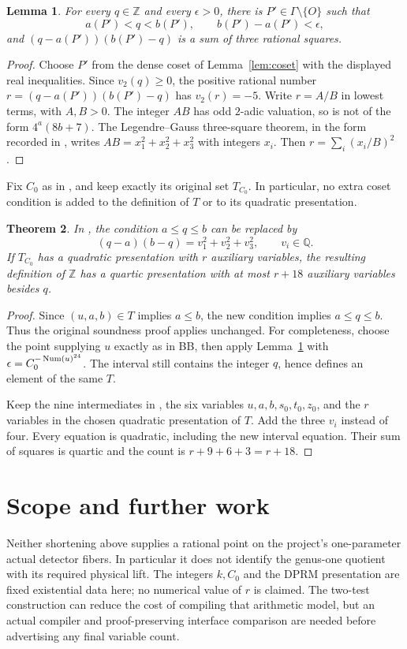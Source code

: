 \documentclass[11pt,a4paper]{article}
\newtheorem{theorem}{Theorem}[section]
\newtheorem{lemma}[theorem]{Lemma}
\newcommand{\Q}{\mathbb Q}\newcommand{\Z}{\mathbb Z}
\begin{document}
\begin{lemma}\label{lem:three}
For every $q\in\Z$ and every $\epsilon>0$, there is
$P'\in\Gamma\setminus\{O\}$ such that
\[
 a(P')<q<b(P'),\qquad b(P')-a(P')<\epsilon,
\]
and $(q-a(P'))(b(P')-q)$ is a sum of three rational squares.
\end{lemma}
\begin{proof}
Choose $P'$ from the dense coset of Lemma~\ref{lem:coset} with
the displayed real inequalities. Since $v_2(q)\ge0$, the positive
rational number $r=(q-a(P'))(b(P')-q)$ has $v_2(r)=-5$.
Write $r=A/B$ in lowest terms, with $A,B>0$. The integer $AB$ has
odd $2$-adic valuation, so is not of the form $4^a(8b+7)$.
The Legendre--Gauss three-square theorem, in the form recorded in
\cite{Squares}, writes $AB=x_1^2+x_2^2+x_3^2$ with integers $x_i$.
Then $r=\sum_i(x_i/B)^2$.
\end{proof}

Fix $C_0$ as in \cite[Theorem A]{BB}, and keep exactly its original
set $T_{C_0}$. In particular, no extra coset condition is added to
the definition of $T$ or to its quadratic presentation.

\begin{theorem}\label{thm:wrapper}
In \cite[Theorem A]{BB}, the condition $a\le q\le b$ can be
replaced by
\[
 (q-a)(b-q)=v_1^2+v_2^2+v_3^2,\qquad v_i\in\Q.
\]
If $T_{C_0}$ has a quadratic presentation with $r$ auxiliary
variables, the resulting definition of $\Z$ has a quartic
presentation with at most $r+18$ auxiliary variables besides $q$.
\end{theorem}
\begin{proof}
Since $(u,a,b)\in T$ implies $a\le b$, the new condition implies
$a\le q\le b$. Thus the original soundness proof applies unchanged.
For completeness, choose the point supplying $u$ exactly as in BB,
then apply Lemma~\ref{lem:three} with
$\epsilon=C_0^{-\operatorname{Num}(u)^{24}}$. The interval still contains the
integer $q$, hence defines an element of the same $T$.

Keep the nine intermediates in \cite[Remark 6.1]{BB}, the six
variables $u,a,b,s_0,t_0,z_0$, and the $r$ variables in the chosen
quadratic presentation of $T$. Add the three $v_i$ instead of four.
Every equation is quadratic, including the new interval equation.
Their sum of squares is quartic and the count is $r+9+6+3=r+18$.
\end{proof}

\section{Scope and further work}
Neither shortening above supplies a rational point on the project's
one-parameter actual detector fibers. In particular it does not
identify the genus-one quotient with its required physical lift.
The integers $k,C_0$ and the DPRM presentation are fixed existential
data here; no numerical value of $r$ is claimed. The two-test
construction can reduce the cost of compiling that arithmetic model,
but an actual compiler and proof-preserving interface comparison are
needed before advertising any final variable count.
\end{document}
